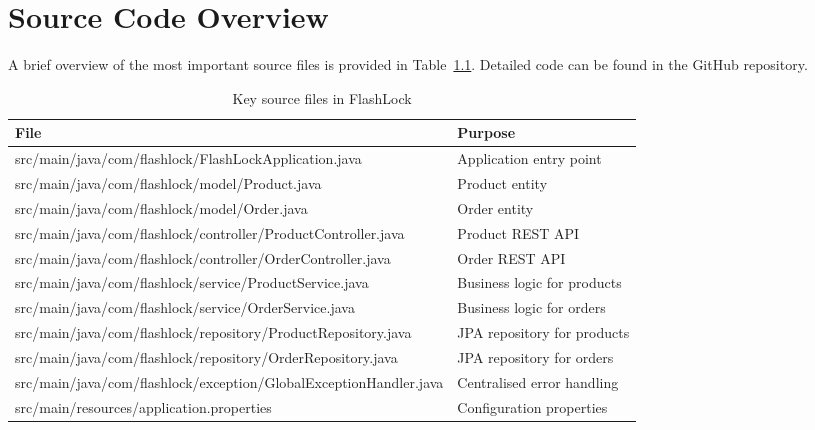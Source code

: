 \documentclass[12pt,a4paper]{report}
\begin{document}
\appendix
\chapter{Source Code Overview}
A brief overview of the most important source files is provided in Table~\ref{tab:source}. Detailed code can be found in the GitHub repository.

\begin{table}[H]
    \centering
    \begin{tabular}{ll}
        \toprule
        File & Purpose \\
        \midrule
        src/main/java/com/flashlock/FlashLockApplication.java & Application entry point \\
        src/main/java/com/flashlock/model/Product.java & Product entity \\
        src/main/java/com/flashlock/model/Order.java & Order entity \\
        src/main/java/com/flashlock/controller/ProductController.java & Product REST API \\
        src/main/java/com/flashlock/controller/OrderController.java & Order REST API \\
        src/main/java/com/flashlock/service/ProductService.java & Business logic for products \\
        src/main/java/com/flashlock/service/OrderService.java & Business logic for orders \\
        src/main/java/com/flashlock/repository/ProductRepository.java & JPA repository for products \\
        src/main/java/com/flashlock/repository/OrderRepository.java & JPA repository for orders \\
        src/main/java/com/flashlock/exception/GlobalExceptionHandler.java & Centralised error handling \\
        src/main/resources/application.properties & Configuration properties \\
        \bottomrule
    \end{tabular}
    \caption{Key source files in FlashLock}
    \label{tab:source}
\end{table}
\end{document}
